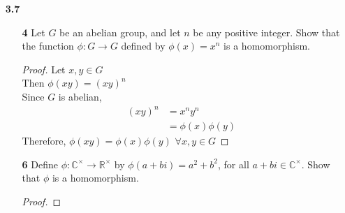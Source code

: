 \documentclass[paper=usletter, fontsize=12pt]{article}
\begin{document}
\begin{itemize}
\begin{itemize}
\begin{proof}
                (ii) For a 3-cycle,
                \begin{equation*}
                    (1,2)(2,3) = (1,3,2)
                \end{equation*}

                (iii) For a product of two (non-disjoint) 3-cycles,
                \begin{equation*}
                    (1,2)(3,4) = (1,2,3)(1,4,3)
                \end{equation*}

                Since $A_n$ is a set of even permutations, is it can be
                expressed as a product of even number of transpositions
                \qedhere

            \end{proof}

        \end{itemize}

        \item[\textbf{3.7}]
        \begin{enumerate}

            \item[\textbf{4}] Let $G$ be an abelian group, and let $n$ be any
            positive integer. Show that the function $\phi: G \rightarrow G$
            defined by $\phi(x)=x^n$ is a homomorphism.
            \begin{proof}

                Let $x,y \in G$\\
                Then $\phi(xy)=(xy)^n$\\
                Since $G$ is abelian,
                \begin{align*}
                    (xy)^n & = x^ny^n\\
                    & = \phi(x)\phi(y)
                \end{align*}
                Therefore, $\phi(xy)=\phi(x)\phi(y)$ $\forall x,y \in G$ \qedhere

            \end{proof}

            \item[\textbf{6}] Define $\phi:
            \mathbb{C}^{\times}\rightarrow\mathbb{R}^{\times}$ by
            $\phi(a+bi)=a^2+b^2$, for all $a+bi\in \mathbb{C}^{\times}$. Show
            that $\phi$ is a homomorphism.
            \begin{proof}


\end{proof}
\end{enumerate}
\end{itemize}
\end{document}
